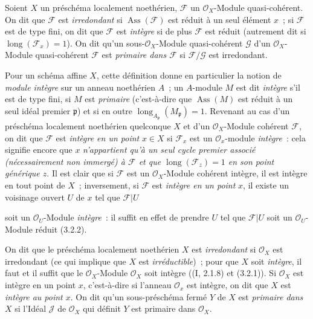 \begin{definition}[3.2.4]
\label{IV.2.3.2.4-fr}
Soient $X$ un préschéma localement noethérien, $\mathcal F$ un
$\mathcal O_X$-Module quasi-cohérent. On dit que $\mathcal F$ est
\emph{irredondant} si $\operatorname{Ass}(\mathcal F)$ est réduit à un seul
élément $x$~; si $\mathcal F$ est de type fini, on dit que $\mathcal F$ est
\emph{intègre} si de plus $\mathcal F$ est réduit (autrement dit si
$\operatorname{long}(\mathcal F_x)=1$). On dit qu'un sous-$\mathcal O_X$-Module
quasi-cohérent $\mathcal G$ d'un $\mathcal O_X$-Module quasi-cohérent
$\mathcal F$ est \emph{primaire dans $\mathcal F$} si
$\mathcal F/\mathcal G$ est irredondant.
\end{definition}

Pour un schéma affine $X$, cette définition donne en particulier la notion de
\emph{module intègre} sur un anneau noethérien $A$~; un $A$-module $M$ est dit
\emph{intègre} s'il est de type fini, si $M$ est \emph{primaire} (c'est-à-dire
que $\operatorname{Ass}(M)$ est réduit à un seul idéal premier
$\mathfrak p$) et si en outre
$\operatorname{long}_{A_\mathfrak p}(M_\mathfrak p)=1$. Revenant au cas d'un
préschéma localement noethérien quelconque $X$ et d'un
$\mathcal O_X$-Module cohérent $\mathcal F$, on dit que $\mathcal F$ est
\emph{intègre en un point} $x\in X$ si $\mathcal F_x$ est un
$\mathcal O_x$-module \emph{intègre}~: cela signifie encore que $x$
\emph{n'appartient qu'à un seul cycle premier associé (nécessairement non
immergé) à $\mathcal F$ et que $\operatorname{long}(\mathcal F_z)=1$ en son
point générique $z$}. Il est clair que si $\mathcal F$ est un
$\mathcal O_X$-Module cohérent intègre, il est intègre en tout point de $X$~;
inversement, si $\mathcal F$ est \emph{intègre en un point} $x$, il existe un
voisinage ouvert $U$ de $x$ tel que $\mathcal F|U$

soit un $\mathcal O_U$-Module \emph{intègre}~: il suffit en effet de prendre
$U$ tel que $\mathcal F|U$ soit un $\mathcal O_U$-Module réduit (3.2.2).

On dit que le préschéma localement noethérien $X$ est \emph{irredondant} si
$\mathcal O_X$ est irredondant (ce qui implique que $X$ est
\emph{irréductible})~; pour que $X$ soit \emph{intègre}, il faut et il suffit
que le $\mathcal O_X$-Module $\mathcal O_X$ soit intègre ((I, 2.1.8) et
(3.2.1)). Si $\mathcal O_X$ est intègre en un point $x$, c'est-à-dire si
l'anneau $\mathcal O_x$ est intègre, on dit que $X$ est \emph{intègre au point
$x$}. On dit qu'un sous-préschéma fermé $Y$ de $X$ est \emph{primaire dans
$X$} si l'Idéal $\mathcal J$ de $\mathcal O_X$ qui définit $Y$ est primaire
dans $\mathcal O_X$.

